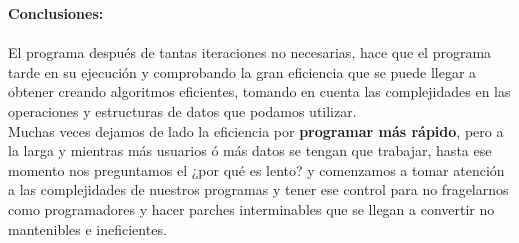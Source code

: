 \documentclass{article}
\begin{document}
  \textbf{Conclusiones:}\\\\

  El programa después de tantas iteraciones no necesarias, hace que el programa tarde en su ejecución y comprobando la gran eficiencia que se puede llegar a obtener creando algoritmos eficientes, tomando en cuenta las complejidades en las operaciones y estructuras de datos que podamos utilizar.\\

  Muchas veces dejamos de lado la eficiencia por \textbf{programar más rápido}, pero a la larga y mientras más usuarios ó más datos se tengan que trabajar, hasta ese momento nos preguntamos el ¿por qué es lento? y comenzamos a tomar atención a las complejidades de nuestros programas y tener ese control para no fragelarnos como programadores y hacer parches interminables que se llegan a convertir no mantenibles e ineficientes.
\end{document}
